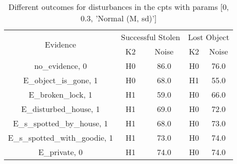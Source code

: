 \begin{table}\begin{tabular}{c|cc|cc}\toprule\multirow{2}{*}{Evidence} & \multicolumn{2}{c}{Successful Stolen} & \multicolumn{2}{c}{Lost Object} \\& {K2} & {Noise} & {K2} & {Noise} \\\midrule
no\_evidence, 0 & \cellcolor{Bittersweet}H0&\cellcolor{Bittersweet}86.0&\cellcolor{Bittersweet}H0&\cellcolor{Bittersweet}76.0\\E\_object\_is\_gone, 1 & \cellcolor{Bittersweet}H0&\cellcolor{Bittersweet}68.0&\cellcolor{Bittersweet}H1&\cellcolor{Bittersweet}55.0\\E\_broken\_lock, 1 & \cellcolor{Bittersweet}H1&\cellcolor{Bittersweet}59.0&\cellcolor{Bittersweet}H0&\cellcolor{Bittersweet}66.0\\E\_disturbed\_house, 1 & \cellcolor{Bittersweet}H1&\cellcolor{Bittersweet}69.0&\cellcolor{Bittersweet}H0&\cellcolor{Bittersweet}72.0\\E\_s\_spotted\_by\_house, 1 & \cellcolor{Bittersweet}H1&\cellcolor{Bittersweet}68.0&\cellcolor{Bittersweet}H0&\cellcolor{Bittersweet}73.0\\E\_s\_spotted\_with\_goodie, 1 & \cellcolor{Bittersweet}H1&\cellcolor{Bittersweet}73.0&\cellcolor{Bittersweet}H0&\cellcolor{Bittersweet}74.0\\E\_private, 0 & \cellcolor{Bittersweet}H1&\cellcolor{Bittersweet}74.0&\cellcolor{Bittersweet}H0&\cellcolor{Bittersweet}74.0\\\bottomrule\end{tabular}\caption{Different outcomes for disturbances in the cpts with params [0, 0.3, 'Normal (M, sd)']}\end{table}